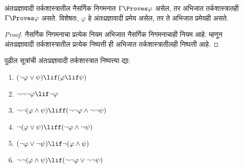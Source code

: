 \begin{prop}
  अंतःप्रज्ञावादी तर्कशास्त्रातील नैसर्गिक निगमनात
  $\Gamma \Proves \varphi$ असेल, तर अभिजात तर्कशास्त्रातही
  $\Gamma \Proves \varphi$ असते. विशेषतः, $\varphi$ हे
  अंतःप्रज्ञावादी प्रमेय असेल, तर ते अभिजात प्रमेयही असते.
\end{prop}
\begin{proof}
  नैसर्गिक निगमनाचा प्रत्येक नियम अभिजात नैसर्गिक
  निगमनाचाही नियम आहे. म्हणून अंतःप्रज्ञावादी
  तर्कशास्त्रातील प्रत्येक निष्पत्ती ही अभिजात
  तर्कशास्त्रातीलही निष्पत्ती आहे.
\end{proof}
\begin{prob}
  पुढील सूत्रांची अंतःप्रज्ञावादी तर्कशास्त्रात
  निष्पत्त्या द्या:
  \begin{enumerate}
    \item $(\lnot \varphi \lor \psi) \lif (\varphi \lif \psi)$
    \item $\lnot\lnot\lnot \varphi \lif \lnot \varphi$
    \item $\lnot\lnot (\varphi \land \psi) \liff (\lnot\lnot \varphi\land \lnot \lnot \psi)$
    \item $\lnot (\varphi \lor \psi) \liff (\lnot \varphi \land \lnot \psi)$
    \item $(\lnot \varphi \lor \lnot \psi) \lif \lnot (\varphi \land \psi)$
    \item $\lnot\lnot ( \varphi \land \psi) \lif  (\lnot\lnot \varphi \lor
    \lnot\lnot \psi)$
  \end{enumerate}
\end{prob}
